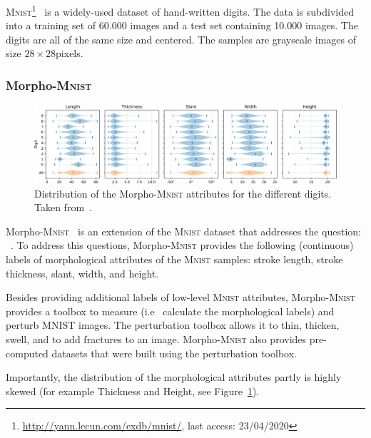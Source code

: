 \textsc{Mnist}\footnote{\href{http://yann.lecun.com/exdb/mnist/}{http://yann.lecun.com/exdb/mnist/}, last access: 23/04/2020}~\citep{lecun1998gradient} is a widely-used dataset of hand-written digits.
The data is subdivided into a training set of 60.000 images and a test set containing 10.000 images.
The digits are all of the same size and centered.
The samples are grayscale images of size $28\times 28$pixels.

\subsubsection{Morpho-\textsc{Mnist}}\label{subsubsec:morphomnist}

\begin{figure}
    \centering
    \includegraphics[width=\textwidth]{images/morpho_mnist_distribution.png}
    \caption[Morpho-\textsc{Mnist} distribution]{Distribution of the Morpho-\textsc{Mnist} attributes for the different digits. Taken from~\citep{castro2019morpho}.}
    \label{fig:morpho_mnist_distribution}
\end{figure}

Morpho-\textsc{Mnist}~\citep{castro2019morpho} is an extension of the \textsc{Mnist} dataset that addresses the question:  ~\citep{castro2019morpho}.
To address this questions, Morpho-\textsc{Mnist} provides the following (continuous) labels of morphological attributes of the \textsc{Mnist} samples: stroke length, stroke thickness, slant, width, and height.

Besides providing additional labels of low-level \textsc{Mnist} attributes, Morpho-\textsc{Mnist} provides a toolbox to measure (i.e~ calculate the morphological labels) and perturb MNIST images.
The perturbation toolbox allows it to thin, thicken, swell, and to add fractures to an image.
Morpho-\textsc{Mnist} also provides pre-computed datasets that were built using the perturbation toolbox.

Importantly, the distribution of the morphological attributes partly is highly skewed (for example Thickness and Height, see Figure~\ref{fig:morpho_mnist_distribution}).

